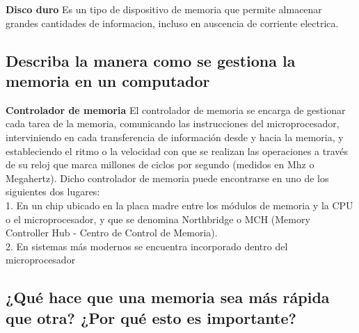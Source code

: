 \documentclass{article}
\begin{document}
	\begin{tcolorbox}[colupper=red!75!black]
		\textbf{Disco duro}
		\tcblower
		Es un tipo de dispositivo de memoria que permite almacenar grandes cantidades de informacion, incluso en auscencia de corriente electrica.
	\end{tcolorbox}
	
	\subsection{Describa la manera como se gestiona la memoria en un computador}
	\begin{tcolorbox}[colupper=red!75!black]
		\textbf{Controlador de memoria}
		\tcblower
		El controlador de memoria se encarga de gestionar cada tarea de la memoria, comunicando las instrucciones del microprocesador, interviniendo en cada transferencia de información desde y hacia la memoria, y estableciendo el ritmo o la velocidad con que se realizan las operaciones a través de su reloj que marca millones de ciclos por segundo (medidos en Mhz o Megahertz).
		\vspace{0.1cm}
		Dicho controlador de memoria puede encontrarse en uno de los siguientes dos lugares:\\
		1. En un chip ubicado en la placa madre entre los módulos de memoria y la CPU o el microprocesador, y que se denomina Northbridge o MCH (Memory Controller Hub - Centro de Control de Memoria).\\
		2. En sistemas más modernos se encuentra incorporado dentro del microprocesador
		
	\end{tcolorbox}
	
	\subsection{¿Qué hace que una memoria sea más rápida que otra? ¿Por qué esto es importante?}
	
	
\end{document}
